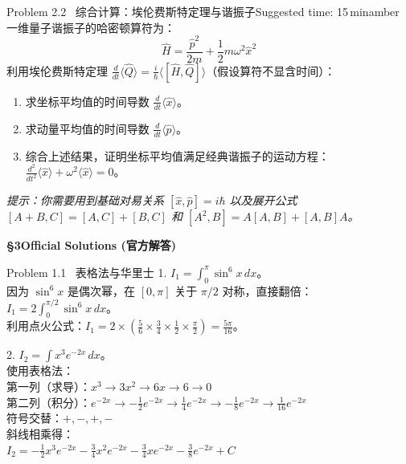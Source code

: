 \documentclass[a4paper,11pt]{article}
\begin{document}
\begin{problembox}{Problem 2.2 \textbar\ 综合计算：埃伦费斯特定理与谐振子}{Suggested time: 15\,min}{amber}
一维量子谐振子的哈密顿算符为：
\[ \hat{H} = \frac{\hat{p}^2}{2m} + \frac{1}{2}m\omega^2 \hat{x}^2 \]
利用埃伦费斯特定理 $\frac{d}{dt}\langle \hat{Q} \rangle = \frac{i}{\hbar}\langle [\hat{H}, \hat{Q}] \rangle$（假设算符不显含时间）：
\begin{enumerate}
    \item 求坐标平均值的时间导数 $\frac{d}{dt}\langle \hat{x} \rangle$。
    \item 求动量平均值的时间导数 $\frac{d}{dt}\langle \hat{p} \rangle$。
    \item 综合上述结果，证明坐标平均值满足经典谐振子的运动方程：$\frac{d^2}{dt^2}\langle \hat{x} \rangle + \omega^2 \langle \hat{x} \rangle = 0$。
\end{enumerate}
\textit{提示：你需要用到基础对易关系 $[\hat{x}, \hat{p}] = i\hbar$ 以及展开公式 $[A+B, C] = [A,C] + [B,C]$ 和 $[A^2, B] = A[A,B] + [A,B]A$。}
\end{problembox}
\vspace{11cm}

\clearpage
{\Large\sffamily\bfseries\color{navy} \S 3\quad Official Solutions (官方解答)}

\begin{solution}{Problem 1.1 \textbar\ 表格法与华里士}
1. $I_1 = \int_0^\pi \sin^6 x \, dx$。\\
因为 $\sin^6 x$ 是偶次幂，在 $[0, \pi]$ 关于 $\pi/2$ 对称，直接翻倍：\\
$I_1 = 2 \int_0^{\pi/2} \sin^6 x \, dx$。\\
利用点火公式：$I_1 = 2 \times \left( \frac{5}{6} \times \frac{3}{4} \times \frac{1}{2} \times \frac{\pi}{2} \right) = \frac{5\pi}{16}$。

2. $I_2 = \int x^3 e^{-2x} \, dx$。\\
使用表格法：\\
第一列（求导）：$x^3 \to 3x^2 \to 6x \to 6 \to 0$\\
第二列（积分）：$e^{-2x} \to -\frac{1}{2}e^{-2x} \to \frac{1}{4}e^{-2x} \to -\frac{1}{8}e^{-2x} \to \frac{1}{16}e^{-2x}$\\
符号交替：$+,-,+,-$\\
斜线相乘得：\\
$I_2 = -\frac{1}{2}x^3 e^{-2x} - \frac{3}{4}x^2 e^{-2x} - \frac{3}{4}x e^{-2x} - \frac{3}{8} e^{-2x} + C$
\end{solution}
\end{document}
